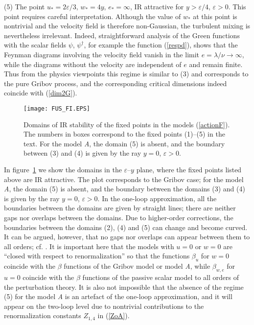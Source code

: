 \documentclass[12pt]{iopart}
\begin{document}
(5) The point $u_{*}=2\varepsilon/3$, $w_{*}=4y$, $e_{*} = \infty$,
IR attractive for $y>\varepsilon/4$, $\varepsilon>0$. This point requires
careful interpretation. Although the value of $w_{*}$ at this point is
nontrivial and the velocity field is therefore non-Gaussian, the
turbulent mixing is nevertheless irrelevant. Indeed, straightforward
analysis of the Green functions with the scalar fields $\psi$, $\psi^{\dag}$,
for example the function (\ref{respd}), shows that the Feynman diagrams
involving the velocity field vanish in the limit $e = \lambda/\nu \to\infty$,
while the diagrams without the velocity are independent of $e$ and remain
finite. Thus from the physics viewpoints this regime is similar to (3)
and corresponds to the pure Gribov process, and the corresponding critical
dimensions indeed coincide with (\ref{dim2G}).

\begin{figure}
\begin{center}
\texttt{[image: FUS\_FI.EPS]}
\caption{\label{fig:patt}
Domains of IR stability of the fixed points in the models
(\protect\ref{actionF}). The numbers in boxes correspond to the fixed
points (1)--(5) in the text. For the model {\it A}, the domain (5) is
absent, and the boundary between (3) and (4) is given by the ray $y=0$,
$\varepsilon>0$.}
\end{center}
\end{figure}


In figure~\ref{fig:patt} we show the domains in the $\varepsilon$--$y$
plane, where the fixed points listed above are IR attractive. The plot
corresponds to the Gribov case; for the model {\it A}, the domain (5)
is absent, and the boundary between the domains (3) and (4) is given by
the ray $y=0$, $\varepsilon>0$. In the one-loop approximation, all the
boundaries between the domains are
given by straight lines; there are neither gaps nor overlaps between the
domains. Due to higher-order corrections, the boundaries between the
domains (2), (4) and (5) can change and become curved. It can be argued,
however, that no gaps nor overlaps can appear between them to all orders;
cf. \cite{AIK,Levy}. It is important here that the models with $u=0$ or
$w=0$ are ``closed with respect to renormalization'' so that the functions
$\beta_{u}$ for $w=0$ coincide with the $\beta$ functions of the Gribov
model or model {\it A}, while $\beta_{w,e}$ for $u=0$ coincide with the
$\beta$ functions of the passive scalar model to all orders of the
perturbation theory. It is also not impossible that the absence of the
regime (5) for the model {\it A} is an artefact of the one-loop
approximation, and it will appear on the two-loop level due to nontrivial
contributions to the renormalization constants $Z_{1,4}$ in (\ref{ZoA}).
\end{document}

